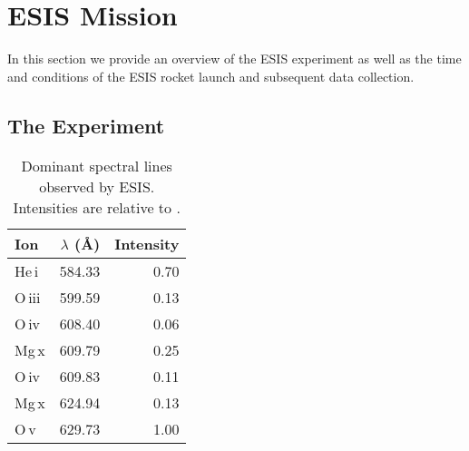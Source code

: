 \section{ESIS Mission}

In this section we provide an overview of the ESIS experiment as well as the time and conditions of the ESIS rocket launch and subsequent data collection.   

	\subsection{The Experiment}
	
	\begin{table}
		\begin{center}
			\caption{Dominant spectral lines observed by ESIS.  Intensities are relative to \ov.}
			\label{tab:linelist}
			\begin{tabular}{l|r|r}
				
				\hline
				Ion & $\lambda$ (\AA) & Intensity \\
				\hline
				He\,{\sc i} & 584.33 & 0.70 \\
				O\,{\sc iii} & 599.59 & 0.13 \\
				O\,{\sc iv} & 608.40 & 0.06 \\
				Mg\,{\sc x} & 609.79 & 0.25 \\
				O\,{\sc iv} & 609.83 & 0.11 \\
				Mg\,{\sc x} & 624.94 & 0.13 \\
				O\,{\sc v} & 629.73 & 1.00 \\

				\hline
			\end{tabular}
		\end{center}
	\end{table}
		
